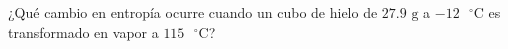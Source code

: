 \item ¿Qué cambio en entropía ocurre cuando un cubo de hielo de $27.9\text{ g}$ a $-12\text{ }^\circ\text{C}$ es transformado en vapor a $115\text{ }^\circ\text{C}$?
